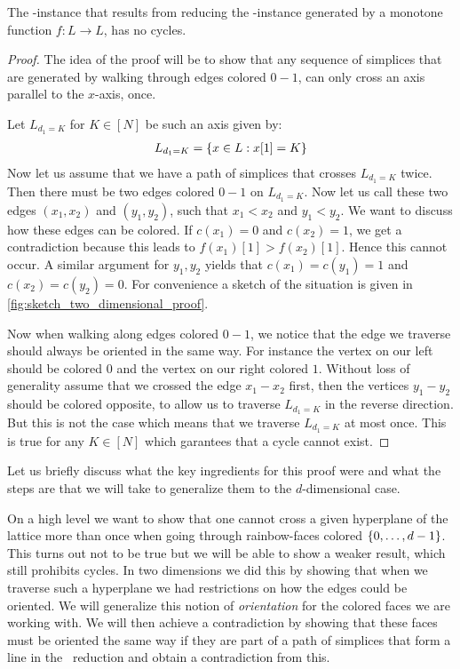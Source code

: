 \begin{proposition}
	The \EndOfLine-instance that results from reducing the \Sperner-instance generated by a monotone function $f : L \rightarrow L$, has no cycles.
\end{proposition}
\begin{proof}
	The idea of the proof will be to show that any sequence of simplices that are generated by walking through edges colored $0 - 1$, can only cross an axis parallel to the $x$-axis, once.

	Let $L_{d_1= K}$ for $K \in [N]$ be such an axis given by:
	\begin{align*}
		L_{d_1=K} = \left\{x \in L : x[1] = K\right\}
	\end{align*}
	Now let us assume that we have a path of simplices that crosses $L_{d_1 = K}$ twice. Then there must be two edges colored $0 - 1$ on $L_{d_1=K}$. Now let us call these two edges $(x_1, x_2)$ and $(y_1, y_2)$, such that $x_1 < x_2$ and $y_1 < y_2$. We want to discuss how these edges can be colored. If $c(x_1) = 0$ and $c(x_2) = 1$, we get a contradiction because this leads to $f(x_1)[1] > f(x_2)[1]$. Hence this cannot occur. A similar argument for $y_1, y_2$ yields that $c(x_1) = c(y_1) =1$ and $c(x_2) = c(y_2) = 0$. For convenience a sketch of the situation is given in \cref{fig:sketch_two_dimensional_proof}.

	Now when walking along edges colored $0 - 1$, we notice that the edge we traverse should always be oriented in the same way. For instance the vertex on our left should be colored $0$ and the vertex on our right colored $1$. Without loss of generality assume that we crossed the edge $x_1 - x_2$ first, then the vertices $y_1 - y_2$ should be colored opposite, to allow us to traverse $L_{d_1=K}$ in the reverse direction. But this is not the case which means that we traverse $L_{d_1=K}$ at most once. This is true for any $K \in [N]$ which garantees that a cycle cannot exist.
\end{proof}
\begin{marginfigure}[-30mm]
	\caption{Sketch of the setting for the two dimensional proof}
\end{marginfigure}

Let us briefly discuss what the key ingredients for this proof were and what the steps are that we will take to generalize them to the $d$-dimensional case.

On a high level we want to show that one cannot cross a given hyperplane of the lattice more than once when going through rainbow-faces colored $\left\{0, \dots, d-1\right\}$. This turns out not to be true but we will be able to show a weaker result, which still prohibits cycles. In two dimensions we did this by showing that when we traverse such a hyperplane we had restrictions on how the edges could be oriented. We will generalize this notion of  \emph{orientation} for the colored faces we are working with. We will then achieve a contradiction by showing that these faces must be oriented the same way if they are part of a path of simplices that form a line in the \EndOfLine\ reduction and obtain a contradiction from this.

